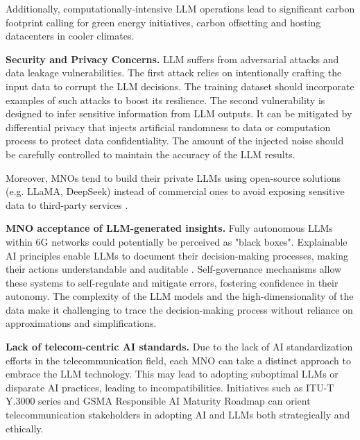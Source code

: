 Additionally, computationally-intensive \gls{LLM} operations lead to significant carbon footprint calling for green energy initiatives, carbon offsetting and hosting datacenters in cooler climates.
\smallskip

\textbf{Security and Privacy Concerns.} \gls{LLM} suffers from adversarial attacks and data leakage vulnerabilities. The first attack relies on intentionally crafting the input data to corrupt the \gls{LLM} decisions. The training dataset should incorporate examples of such attacks to boost its resilience. The second vulnerability is designed to infer sensitive information from \gls{LLM} outputs. It can be mitigated by differential privacy that injects artificial randomness to data or computation process to protect data confidentiality. The amount of the injected noise should be carefully controlled to maintain the accuracy of the \gls{LLM} results.

Moreover, \glspl{MNO} tend to build their private \glspl{LLM} using open-source solutions (e.g. \gls{LLaMA}, DeepSeek) instead of commercial ones to avoid exposing sensitive data to third-party services \cite{Kan2024mobile_llama}.
\smallskip

\textbf{\gls{MNO} acceptance of \gls{LLM}-generated insights.} Fully autonomous \glspl{LLM} within 6G networks could potentially be perceived as "black boxes". Explainable \gls{AI} principles enable \glspl{LLM} to document their decision-making processes, making their actions understandable and auditable \cite{maatouk2024large}. Self-governance mechanisms allow these systems to self-regulate and mitigate errors, fostering confidence in their autonomy. The complexity of the \gls{LLM} models and the high-dimensionality of the data make it challenging to trace the decision-making process without reliance on approximations and simplifications.
\smallskip

\textbf{Lack of telecom-centric \gls{AI} standards.}
Due to the lack of \gls{AI} standardization efforts in the telecommunication field, each \gls{MNO} can take a distinct approach to embrace the \gls{LLM} technology. This may lead to adopting suboptimal \glspl{LLM} or disparate \gls{AI} practices, leading to incompatibilities. Initiatives such as ITU-T Y.3000 series and GSMA Responsible \gls{AI} Maturity Roadmap can orient telecommunication stakeholders in adopting \gls{AI} and \glspl{LLM} both strategically and ethically.

